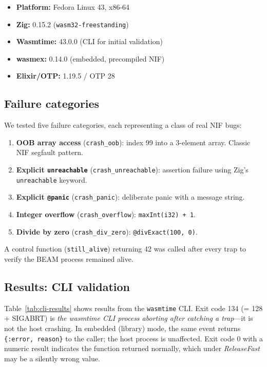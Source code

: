 \documentclass[11pt,a4paper]{article}
\begin{document}
\begin{itemize}
  \item \textbf{Platform:} Fedora Linux 43, x86-64
  \item \textbf{Zig:} 0.15.2 (\texttt{wasm32-freestanding})
  \item \textbf{Wasmtime:} 43.0.0 (CLI for initial validation)
  \item \textbf{wasmex:} 0.14.0 (embedded, precompiled NIF)
  \item \textbf{Elixir/OTP:} 1.19.5 / OTP 28
\end{itemize}

\subsection{Failure categories}

We tested five failure categories, each representing a class of real NIF bugs:

\begin{enumerate}
  \item \textbf{OOB array access} (\texttt{crash\_oob}): index 99 into a
        3-element array. Classic NIF segfault pattern.
  \item \textbf{Explicit \texttt{unreachable}} (\texttt{crash\_unreachable}):
        assertion failure using Zig's \texttt{unreachable} keyword.
  \item \textbf{Explicit \texttt{@panic}} (\texttt{crash\_panic}): deliberate
        panic with a message string.
  \item \textbf{Integer overflow} (\texttt{crash\_overflow}):
        \texttt{maxInt(i32) + 1}.
  \item \textbf{Divide by zero} (\texttt{crash\_div\_zero}):
        \texttt{@divExact(100, 0)}.
\end{enumerate}

A control function (\texttt{still\_alive}) returning 42 was called after every
trap to verify the BEAM process remained alive.

\subsection{Results: CLI validation}
\label{sec:cli-results}

Table~\ref{tab:cli-results} shows results from the \texttt{wasmtime} CLI.
Exit code 134 (= 128 + SIGABRT) is \textit{the wasmtime CLI process aborting
after catching a trap}---it is not the host crashing. In embedded (library)
mode, the same event returns \texttt{\{:error, reason\}} to the caller; the
host process is unaffected. Exit code 0 with a numeric result indicates the
function returned normally, which under \textit{ReleaseFast} may be a silently
wrong value.
\end{document}
